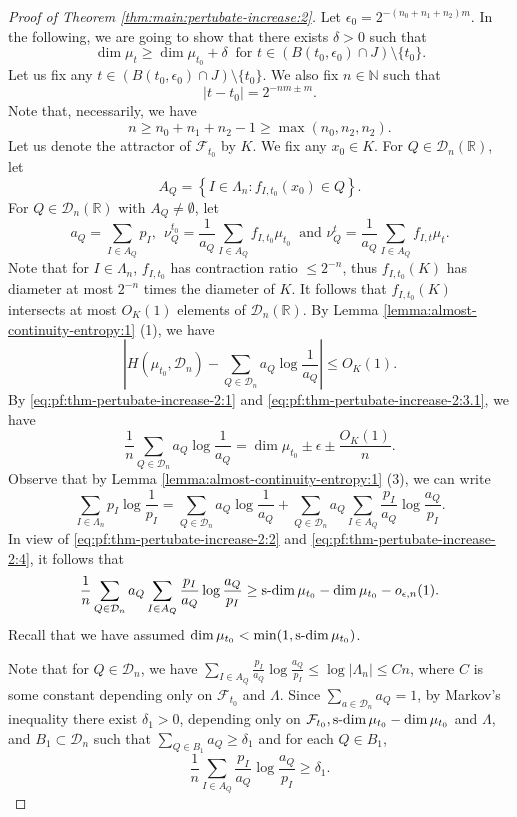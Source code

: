\documentclass[a4paper,11pt]{amsart}
\theoremstyle{definition}
\numberwithin{equation}{section}
\def\D{\mathcal{D}}
\def\F{\mathcal F}
\def\N{\mathbb N}
\def\R{\mathbb R}
\DeclareMathOperator{\sd}{{\rm{s}\textrm{-}\rm{dim}}}
\begin{document}
\begin{proof}[Proof of Theorem  \ref{thm:main:pertubate-increase:2}]
Let $\epsilon_0=2^{-(n_0+n_1+n_2) m}$.  
In the following,  we are going to show that there exists $\delta>0$ such that 
\begin{equation}\label{eq:pf:thm-pertubate-increase-2:3}
\dim \mu_{t} \ge \dim \mu_{t_0} +\delta \ \textrm{ for } t\in (B(t_0,\epsilon_0)\cap J)\setminus \{t_0\}.
\end{equation}
Let us fix any $t\in (B(t_0,\epsilon_0)\cap J)\setminus \{t_0\}$.   We also fix $n\in \N$ such that 
\[|t-t_0| = 2^{-nm\pm m}.\]
Note that,  necessarily,  we have \[n\ge n_0+n_1+n_2-1\ge \max(n_0,n_2,n_2).\]
Let us denote the attractor of $\F_{t_0}$ by $K$.    We fix any  $x_0\in K$.
For $Q\in \D_n(\R)$, let 
\[
A_Q=\left\{ I\in \Lambda_n: f_{I,t_0}(x_0)\in Q \right\}.
\]
For $Q\in \D_n(\R)$ with $A_Q\neq \emptyset$, let 
\[
a_Q=\sum_{I\in A_Q}p_I,   \  \  \nu_Q^{t_0}=\frac{1}{a_Q}\sum_{I\in A_Q}f_{I,t_0}\mu_{t_0}\  \textrm{ and }  \nu_Q^{t}=\frac{1}{a_Q}\sum_{I\in A_Q}f_{I,t}\mu_{t}.
\]
Note that for  $I\in \Lambda_n$,  $f_{I,t_0}$ has contraction ratio $\le 2^{-n}$,  thus  $f_{I,t_0}(K)$ has diameter at most $2^{-n}$ times the diameter of $K$.   It follows that $f_{I,t_0}(K)$ intersects at most $O_{K}(1)$ elements of $\D_{n}(\R)$.
By Lemma \ref{lemma:almost-continuity-entropy:1}  (1),  we have
\begin{equation}\label{eq:pf:thm-pertubate-increase-2:3.1}
\left|H(\mu_{t_0},\D_n)-\sum_{Q\in \D_n}a_Q\log \frac{1}{a_Q}\right| \le O_K(1).
\end{equation}
By \eqref{eq:pf:thm-pertubate-increase-2:1} and \eqref{eq:pf:thm-pertubate-increase-2:3.1},  we have
\begin{equation}\label{eq:pf:thm-pertubate-increase-2:4}
\frac{1}{n}\sum_{Q\in \D_n}a_Q\log \frac{1}{a_Q} =\dim \mu_{t_0} \pm \epsilon\pm \frac{O_K(1)}{n}.
\end{equation}
Observe that by Lemma \ref{lemma:almost-continuity-entropy:1} (3),   we can write
\[
\sum_{I\in \Lambda_n}p_I\log \frac{1}{p_I} =\sum_{Q\in \D_n}a_Q\log \frac{1}{a_Q} +\sum_{Q\in \D_n}a_Q\sum_{I\in A_Q}\frac{p_I}{a_Q}\log \frac{a_Q}{p_I}.
\]
In view of \eqref{eq:pf:thm-pertubate-increase-2:2} and \eqref{eq:pf:thm-pertubate-increase-2:4}, it follows  that 
\[
\frac{1}{n}\sum_{Q\in \D_n}a_Q\sum_{I\in A_Q}\frac{p_I}{a_Q}\log \frac{a_Q}{p_I}\ge \sd \mu_{t_0}-\dim\mu_{t_0}-o_{\epsilon,n}(1).
\]
Recall that we have assumed $\dim\mu_{t_0}<\min(1,\sd \mu_{t_0})$.

Note that for $Q\in \D_n$,  we have $\sum_{I\in A_Q}\frac{p_I}{a_Q}\log \frac{a_Q}{p_I}\le \log |\Lambda_n|\le Cn$, where $C$ is some constant depending only on $\F_{t_0}$ and $\Lambda$.   Since $\sum_{a\in \D_n}a_Q=1$,  by Markov's inequality there exist $\delta_1>0$,  depending only on $ \F_{t_0},  \sd \mu_{t_0}-\dim\mu_{t_0}$ and $\Lambda$,  and  $B_1\subset \D_n$ such that $\sum_{Q\in B_1}a_Q\ge \delta_1$ and for each $Q\in B_1$,
\begin{equation}\label{eq:pf:thm-pertubate-increase-2:6}
\frac{1}{n}\sum_{I\in A_Q}\frac{p_I}{a_Q}\log \frac{a_Q}{p_I} \ge \delta_1.
\end{equation}


\end{proof}
\end{document}
